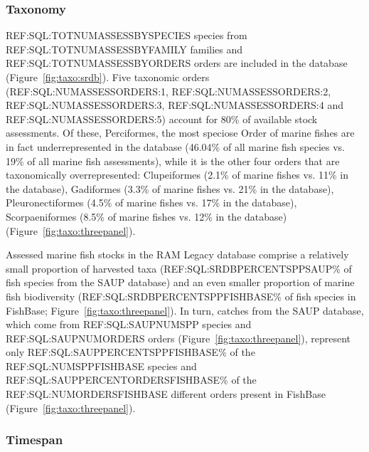 \subsubsection*{Taxonomy}

REF:SQL:TOTNUMASSESSBYSPECIES species from
REF:SQL:TOTNUMASSESSBYFAMILY families and REF:SQL:TOTNUMASSESSBYORDERS
orders are included in the database (Figure~\ref{fig:taxo:srdb}). Five
taxonomic orders (REF:SQL:NUMASSESSORDERS:1,
REF:SQL:NUMASSESSORDERS:2, REF:SQL:NUMASSESSORDERS:3,
REF:SQL:NUMASSESSORDERS:4 and REF:SQL:NUMASSESSORDERS:5) account for
80\% of available stock assessments.  Of these, Perciformes, the
most speciose Order of marine fishes are in fact underrepresented in
the database (46.04\% of all marine fish species vs.  19\%
of all marine fish assessments), while it is the other four orders
that are taxonomically overrepresented: Clupeiformes (2.1\% of marine
fishes vs.  11\% in the database), Gadiformes (3.3\% of marine fishes
vs.  21\% in the database), Pleuronectiformes (4.5\% of marine fishes
vs.  17\% in the database), Scorpaeniformes (8.5\% of marine fishes
vs. 12\% in the database) (Figure~\ref{fig:taxo:threepanel}).

Assessed marine fish stocks in the RAM Legacy database comprise a
relatively small proportion of harvested taxa (REF:SQL:SRDBPERCENTSPPSAUP\% of fish species
from the SAUP database) and an even smaller proportion of marine fish
biodiversity (REF:SQL:SRDBPERCENTSPPFISHBASE\% of fish species in FishBase;
Figure~\ref{fig:taxo:threepanel}). In turn, catches from the SAUP
database, which come from REF:SQL:SAUPNUMSPP species and
REF:SQL:SAUPNUMORDERS orders (Figure~\ref{fig:taxo:threepanel}),
represent only REF:SQL:SAUPPERCENTSPPFISHBASE\% of the REF:SQL:NUMSPPFISHBASE species and REF:SQL:SAUPPERCENTORDERSFISHBASE\% of
the REF:SQL:NUMORDERSFISHBASE different orders present in FishBase
(Figure~\ref{fig:taxo:threepanel}).




\subsubsection*{Timespan }

